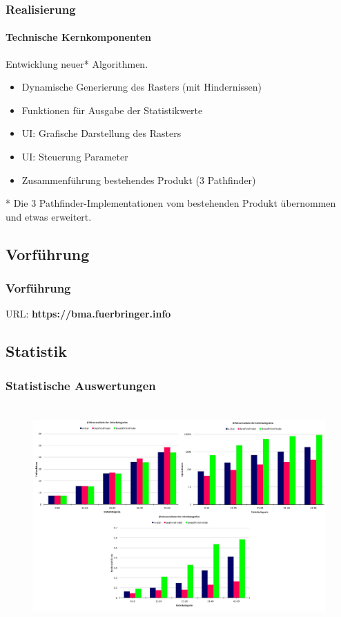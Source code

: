 \documentclass[professionalfont,serif,german]{beamer}
\begin{document}
\begin{frame}
  \frametitle{Realisierung}
  \framesubtitle{Technische Kernkomponenten}
  Entwicklung neuer* Algorithmen.
  \begin{itemize}
    \item Dynamische Generierung des Rasters (mit Hindernissen)
    \item Funktionen für Ausgabe der Statistikwerte
    \item UI: Grafische Darstellung des Rasters
    \item UI: Steuerung Parameter
    \item Zusammenführung bestehendes Produkt (3 Pathfinder)
  \end{itemize}
  \scriptsize{* Die 3 Pathfinder-Implementationen vom bestehenden Produkt übernommen und etwas erweitert.}
\end{frame}

\begin{frame}
  \section[Vorführung]{Vorführung}
  \frametitle{Vorführung}
  \begin{center}
    URL: \textbf{https://bma.fuerbringer.info}
  \end{center}
\end{frame}


\begin{frame}
  \section[Statistik]{Statistik}
  \frametitle{Statistische Auswertungen}
  \begin{columns}
    \begin{column}[T]{1.1\textwidth}
      \begin{figure}
        \includegraphics[height=7.75cm]{../thesis/images/statistik_all2.JPG}
      \end{figure}
    \end{column}
  \end{columns}
\end{frame}
\end{document}
